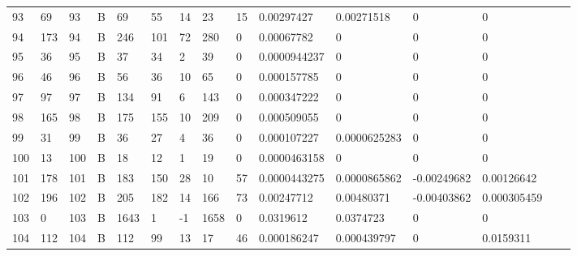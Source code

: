 \begin{longtable}{lllllllllllllll}
	93  & 69                & 93  & B   & 69                & 55                & 14                & 23   & 15         & 0.00297427     & 0.00271518     & 0             & 0            \\
	94  & 173               & 94  & B   & 246               & 101               & 72                & 280  & 0          & 0.00067782     & 0              & 0             & 0            \\
	95  & 36                & 95  & B   & 37                & 34                & 2                 & 39   & 0          & 0.0000944237   & 0              & 0             & 0            \\
	96  & 46                & 96  & B   & 56                & 36                & 10                & 65   & 0          & 0.000157785    & 0              & 0             & 0            \\
	97  & 97                & 97  & B   & 134               & 91                & 6                 & 143  & 0          & 0.000347222    & 0              & 0             & 0            \\
	98  & 165               & 98  & B   & 175               & 155               & 10                & 209  & 0          & 0.000509055    & 0              & 0             & 0            \\
	99  & 31                & 99  & B   & 36                & 27                & 4                 & 36   & 0          & 0.000107227    & 0.0000625283   & 0             & 0            \\
	100 & 13                & 100 & B   & 18                & 12                & 1                 & 19   & 0          & 0.0000463158   & 0              & 0             & 0            \\
	101 & 178               & 101 & B   & 183               & 150               & 28                & 10   & 57         & 0.0000443275   & 0.0000865862   & -0.00249682   & 0.00126642   \\
	102 & 196               & 102 & B   & 205               & 182               & 14                & 166  & 73         & 0.00247712     & 0.00480371     & -0.00403862   & 0.000305459  \\
	103 & 0                 & 103 & B   & 1643              & 1                 & -1                & 1658 & 0          & 0.0319612      & 0.0374723      & 0             & 0            \\
	104 & 112               & 104 & B   & 112               & 99                & 13                & 17   & 46         & 0.000186247    & 0.000439797    & 0             & 0.0159311    \\

\end{longtable}
